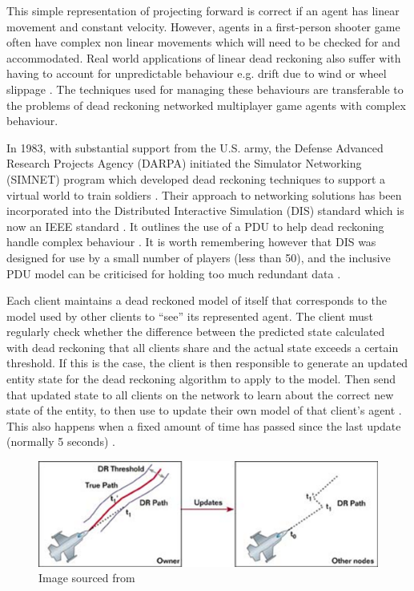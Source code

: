 \documentclass[journal]{IEEEtran}
\begin{document}
This simple representation of projecting forward is correct if an agent has linear movement and constant velocity. However, agents in a first-person shooter game often have complex non linear movements which will need to be checked for and accommodated. Real world applications of linear dead reckoning also suffer with having to account for unpredictable behaviour e.g. drift due to wind or wheel slippage \cite{chung2001accurate} \cite{ojeda2004experimental}. The techniques used for managing these behaviours are transferable to the problems of dead reckoning networked multiplayer game agents with complex behaviour.

In 1983, with substantial support from the U.S. army, the Defense Advanced Research Projects Agency (DARPA) initiated the Simulator Networking (SIMNET) program which developed dead reckoning techniques to support a virtual world to train soldiers \cite{calvin1993simnet}. Their approach to networking solutions has been incorporated into the Distributed Interactive Simulation (DIS) standard which is now an IEEE standard \cite{dis1998ieee}. It outlines the use of a PDU to help dead reckoning handle complex behaviour \cite{mccarty1994virtual}. It is worth remembering however that DIS was designed for use by a small number of players (less than 50), and the inclusive PDU model can be criticised for holding too much redundant data \cite{henderson2001latency}.
 
Each client maintains a dead reckoned model of itself that corresponds to the model used by other clients to ``see'' its represented agent. The client must regularly check whether the difference between the predicted state calculated with dead reckoning that all clients share and the actual state exceeds a certain threshold. If this is the case, the client is then responsible to generate an updated entity state for the dead reckoning algorithm to apply to the model. Then send that updated state to all clients on the network to learn about the correct new state of the entity, to then use to update their own model of that client's agent \cite{calvin1993simnet} \cite{mauve2000keep}. This also happens when a fixed amount of time has passed since the last update (normally 5 seconds) \cite{mills1992network}.

\begin{figure}[h]
    \centering
    \includegraphics[width=0.8\linewidth]{Threshold1.png}
    \caption{Image sourced from \cite{aronson1997gamasutra}}
    \label{fig:threshold}
\end{figure}
\end{document}
